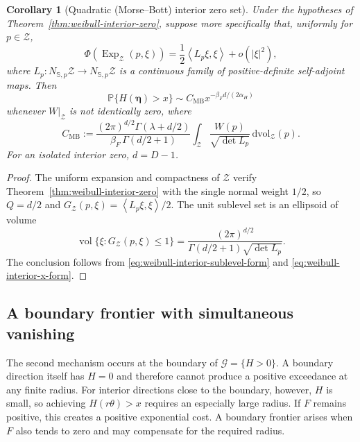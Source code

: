 \documentclass[11pt]{amsart}
\numberwithin{equation}{section}
\newtheorem{corollary}[theorem]{Corollary}
\theoremstyle{definition}
\theoremstyle{remark}
\newcommand{\dvol}{\,\mathrm{dvol}}
\newcommand{\vol}{\operatorname{vol}}
\newcommand{\inner}[2]{\left\langle #1,#2\right\rangle}
\begin{document}
\begin{corollary}[Quadratic (Morse--Bott) interior zero set]
\label{cor:weibull-interior-morse-bott}
Under the hypotheses of Theorem~\ref{thm:weibull-interior-zero}, suppose more
specifically that, uniformly for $p\in\mathcal Z$,
\begin{equation}\label{eq:weibull-interior-morse-bott-model}
 \Phi(\operatorname{Exp}_{\mathcal Z}(p,\xi))
 =\frac12\inner{L_p\xi}{\xi}+o(|\xi|^2),
\end{equation}
where $L_p:N_{\mathbb S,p}\mathcal Z\to N_{\mathbb S,p}\mathcal Z$ is a
continuous family of positive-definite self-adjoint maps.  Then
\begin{equation}\label{eq:weibull-interior-morse-bott-asymptotic}
 \mathbb P\{H(\bm\eta)>x\}
 \sim C_{\mathrm{MB}}x^{-\beta_F d/(2\alpha_H)}
\end{equation}
whenever $W|_{\mathcal Z}$ is not identically zero, where
\begin{equation}\label{eq:weibull-interior-morse-bott-constant}
 C_{\mathrm{MB}}
 :=\frac{(2\pi)^{d/2}\Gamma(\lambda+d/2)}
 {\beta_F\,\Gamma(d/2+1)}
 \int_{\mathcal Z}
 \frac{W(p)}{\sqrt{\det L_p}}\dvol_{\mathcal Z}(p).
\end{equation}
For an isolated interior zero, $d=D-1$.
\end{corollary}

\begin{proof}
The uniform expansion and compactness of $\mathcal Z$ verify
Theorem~\ref{thm:weibull-interior-zero} with the single normal weight $1/2$,
so $Q=d/2$ and
$G_{\mathcal Z}(p,\xi)=\inner{L_p\xi}{\xi}/2$.  The unit sublevel set is an
ellipsoid of volume
\[
 \vol\{\xi:G_{\mathcal Z}(p,\xi)\le1\}
 =\frac{(2\pi)^{d/2}}
 {\Gamma(d/2+1)\sqrt{\det L_p}}.
\]
The conclusion follows from
\eqref{eq:weibull-interior-sublevel-form} and
\eqref{eq:weibull-interior-x-form}.
\end{proof}


\subsection{A boundary frontier with simultaneous vanishing}
\label{subsec:weibull-boundary-frontier}

The second mechanism occurs at the boundary of
$\mathcal G=\{H>0\}$.  A boundary direction itself has $H=0$ and therefore
cannot produce a positive exceedance at any finite radius.  For interior directions close to the
boundary, however, $H$ is small, so achieving $H(r\theta)>x$ requires an
especially large radius.  If $F$ remains positive, this creates a positive
exponential cost.  A boundary frontier arises when $F$ also tends to zero and
may compensate for the required radius.
\end{document}
